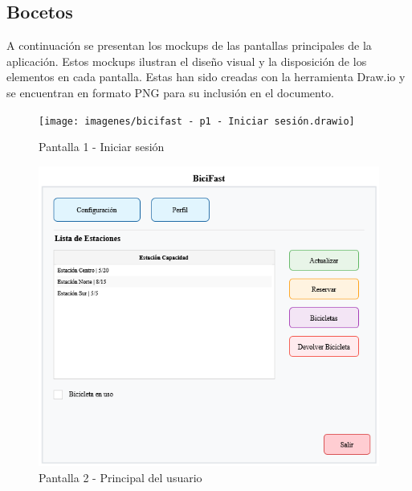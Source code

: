     \clearpage

    \subsection{Bocetos}\label{subsec:mockups}

    A continuación se presentan los mockups de las pantallas principales de la aplicación.
    Estos mockups ilustran el diseño visual y la disposición de los elementos en cada pantalla.
    Estas han sido creadas con la herramienta Draw.io y se encuentran en formato PNG para su inclusión en el documento. %
    \begin{figure}[ht]
        \centering
        \texttt{[image: imagenes/bicifast - p1 - Iniciar sesión.drawio]}
        \caption{Pantalla 1 - Iniciar sesión}
        \label{fig:bicifast---p1---iniciar-sesion.drawio}
    \end{figure}

    \begin{figure}
        \centering
        \includegraphics[scale=0.50]{imagenes/bicifast - pantalla 2 -principal usuario}
        \caption{Pantalla 2 - Principal del usuario}
        \label{fig:bicifast---pantalla-2--principal-usuario}
    \end{figure}

